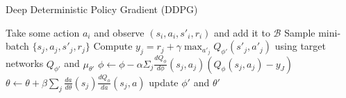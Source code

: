 \begin{algorithm}[t!]
\caption{Deep Deterministic Policy Gradient (DDPG)}
\begin{algorithmic}[1]
\label{alg:ddpg}
    \STATE Take some action $a_i$ and observe $(s_i,a_i,s'_i,r_i)$ and add it to $\mathcal{B}$
    \STATE Sample mini-batch $\{s_j,a_j,s'_j,r_j\}$
    \STATE Compute $y_j = r_j + \gamma \max_{a'_j}Q_{\phi'}(s'_j,a'_j)$ using target networks $Q_{\phi'}$ and $\mu_{\theta'}$
    \STATE $\phi \leftarrow \phi-\alpha\Sigma_j\frac{dQ_\phi}{d\phi}(s_j,a_j)(Q_\phi(s_j,a_j) - y_J)$
    \STATE $\theta \leftarrow \theta + \beta\sum_j\frac{da}{d\theta}(s_j)\frac{dQ_\phi}{da}(s_j,a)$
    \STATE update $\phi'$ and $\theta'$
\ENDWHILE
\end{algorithmic}
\end{algorithm}